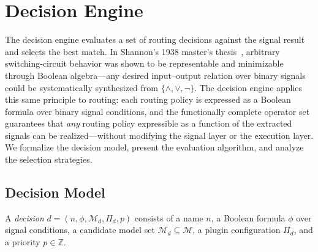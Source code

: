 
\section{Decision Engine}
\label{sec:decision_engine}

The decision engine evaluates a set of routing decisions against the signal result and selects the best match.
In Shannon's 1938 master's thesis~\cite{shannon1938symbolic}, arbitrary switching-circuit behavior was shown to be representable and minimizable through Boolean algebra---any desired input--output relation over binary signals could be systematically synthesized from $\{\wedge, \vee, \neg\}$.
The decision engine applies this same principle to routing: each routing policy is expressed as a Boolean formula over binary signal conditions, and the functionally complete operator set guarantees that \emph{any} routing policy expressible as a function of the extracted signals can be realized---without modifying the signal layer or the execution layer.
We formalize the decision model, present the evaluation algorithm, and analyze the selection strategies.

\subsection{Decision Model}

\begin{definition}[Decision]
A \emph{decision} $d = (n, \phi, \mathcal{M}_d, \Pi_d, p)$ consists of a name $n$, a Boolean formula $\phi$ over signal conditions, a candidate model set $\mathcal{M}_d \subseteq \mathcal{M}$, a plugin configuration $\Pi_d$, and a priority $p \in \mathbb{Z}$.
\end{definition}

